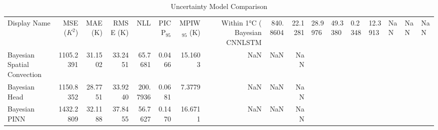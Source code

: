 \begin{table}
\caption{Uncertainty Model Comparison}
\begin{tabular}{lrrrrrrrrr}
\toprule
Display Name & MSE ($K^2$) & MAE (K) & RMSE (K) & NLL & PICP$_{95}$ & MPIW$_{95}$ (K) & Within 1°C (%
\midrule
Bayesian CNNLSTM & 840.8604 & 22.1281 & 28.9976 & 49.3380 & 0.2348 & 12.3913 & NaN & NaN & NaN \\
Bayesian Spatial Convection & 1105.2391 & 31.1502 & 33.2451 & 65.7681 & 0.0466 & 15.1603 & NaN & NaN & NaN \\
Bayesian Head & 1150.8352 & 28.7751 & 33.9240 & 200.7936 & 0.0681 & 7.3779 & NaN & NaN & NaN \\
Bayesian PINN & 1432.2809 & 32.1188 & 37.8455 & 56.7627 & 0.1470 & 16.6711 & NaN & NaN & NaN \\
\bottomrule
\end{tabular}
\end{table}
